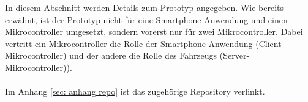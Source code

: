 In diesem Abschnitt werden Details zum Prototyp angegeben. Wie bereits erwähnt, ist der Prototyp nicht für eine Smartphone-Anwendung und einen Mikrocontroller umgesetzt, sondern vorerst nur für zwei Mikrocontroller. Dabei vertritt ein Mikrocontroller die Rolle der Smartphone-Anwendung (Client-Mikrocontroller) und der andere die Rolle des Fahrzeugs (Server-Mikrocontroller)).
\\\\
Im Anhang \ref{sec: anhang repo} ist das zugehörige Repository verlinkt.